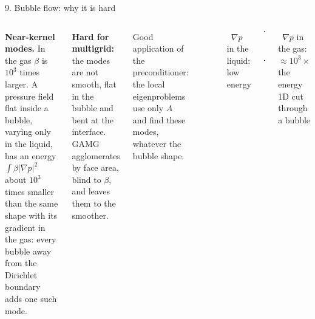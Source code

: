\documentclass[aspectratio=169,10pt]{beamer}
\newcommand{\muted}[1]{{\color{ink2}#1}}
\begin{document}
\begin{frame}{9. Bubble flow: why it is hard}
  \begin{columns}[c,onlytextwidth]
    \small\setlength{\parskip}{7pt}%
    \textbf{\color{schwarz}Near-kernel modes.} In the gas $\beta$ is $10^3$ times larger. A pressure field
    flat inside a bubble, varying only in the liquid, has an energy $\int\beta|\nabla p|^2$ about $10^3$
    times smaller than the same shape with its gradient in the gas: every bubble away from the Dirichlet
    boundary adds one such mode.

    \textbf{\color{schwarz}Hard for multigrid:} the modes are not smooth, flat in the bubble and bent at the
    interface. GAMG agglomerates by face area, blind to $\beta$, and leaves them to the smoother.

    \vspace{2mm} 
    Good application of the preconditioner: the local eigenproblems use only $A$ and find these
    modes, whatever the bubble shape.

    \centering
    \\[1mm]
    {\scriptsize
    \textcolor{schwarz}{\rule[0.5ex]{5mm}{1pt}}\ $\nabla p$ in the liquid: low energy\\
    \textcolor{gamg}{\rule[0.5ex]{1.6mm}{1pt}\,\rule[0.5ex]{1.6mm}{1pt}}\ $\nabla p$ in the gas: $\approx10^3\times$ the energy\\[1mm]
    \muted{1D cut through a bubble}}
  \end{columns}
\end{frame}
\end{document}
